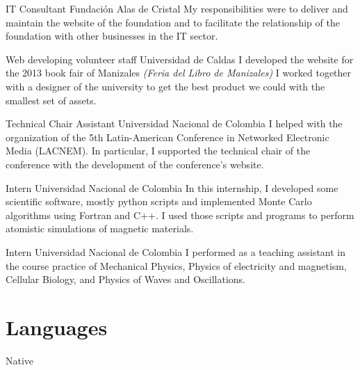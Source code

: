 \documentclass[12pt,english]{moderncv}
\begin{document}
        {IT Consultant}
        {Fundación Alas de Cristal}
        {}
        {}
        {%
            My responsibilities were to deliver and maintain the website of the
            foundation and to facilitate the relationship of the foundation
            with other businesses in the IT sector.
        }

        {Web developing volunteer staff}
        {Universidad de Caldas}
        {}
        {}
        {%
            I developed the website for the 2013 book fair of Manizales
            \textit{(Feria del Libro de Manizales)} I worked together with a
            designer of the university to get the best product we could with
            the smallest set of assets.
        }

        {Technical Chair Assistant}
        {Universidad Nacional de Colombia}
        {}
        {}
        {%
            I helped with the organization of the 5th Latin-American Conference
            in Networked Electronic Media (LACNEM). In particular, I supported
            the technical chair of the conference with the development of the
            conference's website.
        }

        {Intern}
        {Universidad Nacional de Colombia}
        {}
        {}
        {%
            In this internship, I developed some scientific software, mostly
            python scripts and implemented Monte Carlo algorithms using Fortran
            and C++. I used those scripts and programs to perform atomistic
            simulations of magnetic materials.
        }

        {Intern}
        {Universidad Nacional de Colombia}
        {}
        {}
        {%
            I performed as a teaching assistant in the course practice of
            Mechanical Physics, Physics of electricity and magnetism, Cellular
            Biology, and Physics of Waves and Oscillations.
        }


\section{Languages}

           {Native}
           {}
\end{document}
